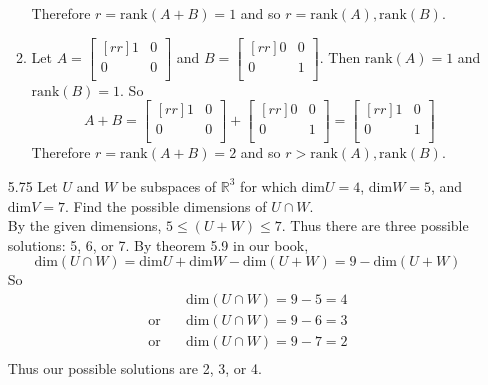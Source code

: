 \documentclass[12pt]{article}
\begin{document}
\begin{enumerate}
\begin{enumerate}
	Therefore $r=\mathrm{rank}(A+B)=1$ and so $r=\mathrm{rank}(A),\mathrm{rank}(B)$.
	\item Let $A=\begin{bmatrix}[rr]1&0\\0&0\\\end{bmatrix}$ and $B=\begin{bmatrix}[rr]0&0\\0&1\\\end{bmatrix}$. Then $\mathrm{rank}(A) = 1$ and $\mathrm{rank}(B) = 1$. So
	\[ A+B = \begin{bmatrix}[rr]1&0\\0&0\\\end{bmatrix}+\begin{bmatrix}[rr]0&0\\0&1\\\end{bmatrix}=\begin{bmatrix}[rr]1&0\\0&1\\\end{bmatrix} \]
	Therefore $r=\mathrm{rank}(A+B)=2$ and so $r>\mathrm{rank}(A),\mathrm{rank}(B)$.
	\end{enumerate}

\item[5.75] Let $U$ and $W$ be subspaces of $\mathbb{R}^3$ for which $\mathrm{dim}U=4$, $\mathrm{dim}W=5$, and $\mathrm{dim}V=7$. Find the possible dimensions of $U \cap W$.\\
	By the given dimensions, $5\leq (U+W) \leq 7$. Thus there are three possible solutions: 5, 6, or 7. By theorem 5.9 in our book,
	\[ \mathrm{dim}(U\cap W) = \mathrm{dim}U+\mathrm{dim}W-\mathrm{dim}(U+W)=9-\mathrm{dim}(U+W) \]
	So
	\begin{align*}
	&\mathrm{dim}(U\cap W) = 9 - 5 = 4\\
	\mathrm{or} \quad &\mathrm{dim}(U\cap W) = 9 - 6 = 3\\
	\mathrm{or} \quad &\mathrm{dim}(U\cap W) = 9 - 7 = 2\\
	\end{align*}
	Thus our possible solutions are 2, 3, or 4.


\end{enumerate}
\end{document}
